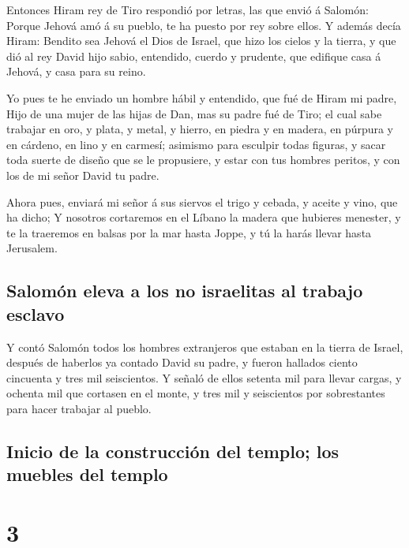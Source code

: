  Entonces Hiram rey de Tiro respondió por letras, las que
envió á Salomón: Porque Jehová amó á su pueblo, te ha puesto por rey
sobre ellos.  Y además decía Hiram: Bendito sea Jehová el
Dios de Israel, que hizo los cielos y la tierra, y que dió al rey David
hijo sabio, entendido, cuerdo y prudente, que edifique casa á Jehová, y
casa para su reino.

 Yo pues te he enviado un hombre hábil y entendido, que
fué de Hiram mi padre,  Hijo de una mujer de las hijas de
Dan, mas su padre fué de Tiro; el cual sabe trabajar en oro, y plata, y
metal, y hierro, en piedra y en madera, en púrpura y en cárdeno, en lino
y en carmesí; asimismo para esculpir todas figuras, y sacar toda suerte
de diseño que se le propusiere, y estar con tus hombres peritos, y con
los de mi señor David tu padre.

 Ahora pues, enviará mi señor á sus siervos el trigo y
cebada, y aceite y vino, que ha dicho;  Y nosotros
cortaremos en el Líbano la madera que hubieres menester, y te la
traeremos en balsas por la mar hasta Joppe, y tú la harás llevar hasta
Jerusalem.

\hypertarget{salomuxf3n-eleva-a-los-no-israelitas-al-trabajo-esclavo}{%
\subsection{Salomón eleva a los no israelitas al trabajo
esclavo}\label{salomuxf3n-eleva-a-los-no-israelitas-al-trabajo-esclavo}}

 Y contó Salomón todos los hombres extranjeros que
estaban en la tierra de Israel, después de haberlos ya contado David su
padre, y fueron hallados ciento cincuenta y tres mil seiscientos.
 Y señaló de ellos setenta mil para llevar cargas, y
ochenta mil que cortasen en el monte, y tres mil y seiscientos por
sobrestantes para hacer trabajar al pueblo.

\hypertarget{inicio-de-la-construcciuxf3n-del-templo-los-muebles-del-templo}{%
\subsection{Inicio de la construcción del templo; los muebles del
templo}\label{inicio-de-la-construcciuxf3n-del-templo-los-muebles-del-templo}}

\hypertarget{section-14-3}{%
\section{3}\label{section-14-3}}

